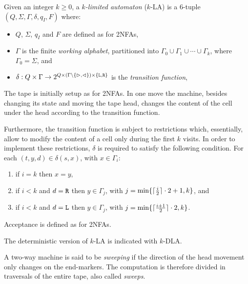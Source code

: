 \begin{defn}
	Given an integer $k\ge0$, a \emph{$k$-limited automaton} ($k$-LA) is a 6-tuple $(Q,\Sigma,\Gamma,\delta,q_I,F)$ where:
	\begin{itemize}
		\item $Q$, $\Sigma$, $q_I$ and $F$ are defined as for 2NFAs,
		\item $\Gamma$ is the finite \emph{working alphabet}, partitioned into $\Gamma_0\cup\Gamma_1\cup\cdots\cup\Gamma_k$, where $\Gamma_0=\Sigma$, and
		\item $\delta:Q\times\Gamma\to2^{Q\times(\Gamma\setminus\{\rhd,\lhd\})\times\{\mathtt L,\mathtt R\}}$ is the \emph{transition function},
	\end{itemize}
	The tape is initially setup as for 2NFAs.
	In one move the machine, besides changing its state and moving the tape head, changes the content of the cell under the head according to the transition function.

	Furthermore, the transition function is subject to restrictions which, essentially, allow to modify the content of a cell only during the first $k$ visits.
	In order to implement these restrictions, $\delta$ is required to satisfy the following condition. For each $(t,y,d)\in\delta(s,x)$, with $x\in\Gamma_i$:
	\begin{enumerate}[(1)]
		\item if $i=k$ then $x=y$,
		\item if $i<k$ and $d=\mathtt R$ then $y\in\Gamma_j$, with $j=\min\{\lceil \frac{i}{2} \rceil\cdot 2+1,k\}$, and
		\item if $i<k$ and $d=\mathtt L$ then $y\in\Gamma_j$, with $j=\min\{\lceil \frac{i+1}{2} \rceil\cdot 2,k\}$.
	\end{enumerate}

	\noindent Acceptance is defined as for 2NFAs.

	\noindent The deterministic version of $k$-LA is indicated with $k$-DLA.
\end{defn}



\begin{defn}
	A two-way machine is said to be \emph{sweeping} if the direction of the head movement only changes on the end-markers.
	The computation is therefore divided in traversals of the entire tape, also called \emph{sweeps}.
\end{defn}
